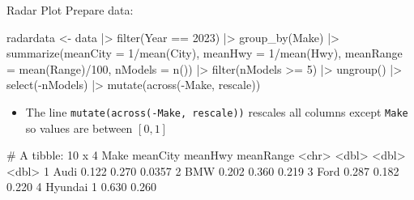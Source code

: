 \documentclass[ignorenonframetext,xcolor=x11names]{beamer}
\begin{document}


     



\begin{frame}[fragile]{Radar Plot}
Prepare data:
\begin{Rcode}
radardata <- data |>
  filter(Year == 2023) |> group_by(Make) |>
  summarize(meanCity = 1/mean(City), 
            meanHwy = 1/mean(Hwy), 
            meanRange = mean(Range)/100, 
            nModels = n()) |>
  filter(nModels >= 5) |> ungroup() |>
  select(-nModels) |>
  mutate(across(-Make, rescale))
\end{Rcode}

\footnotesize
\begin{itemize}
   \item The line \texttt{mutate(across(-Make, rescale))} rescales all columns except \texttt{Make} so values are between $[0,1]$
\end{itemize}

\begin{textcode}
# A tibble: 10 x 4
   Make          meanCity meanHwy meanRange
   <chr>            <dbl>   <dbl>     <dbl>
 1 Audi            0.122    0.270    0.0357
 2 BMW             0.202    0.360    0.219 
 3 Ford            0.287    0.182    0.220 
 4 Hyundai         1        0.630    0.260 
\end{textcode}
\end{frame}
\end{document}

